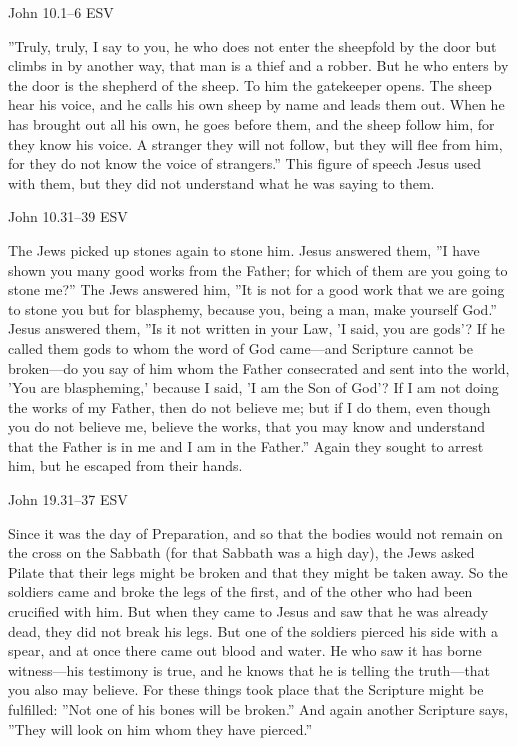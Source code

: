 \documentclass[
]{article}
\newcommand{\RL}[1]{\beginR #1\endR}
\begin{document}
John 10.1--6 ESV

\RL{''}Truly, truly, I say to you, he who does not enter the sheepfold
by the door but climbs in by another way, that man is a thief and a
robber. But he who enters by the door is the shepherd of the sheep. To
him the gatekeeper opens. The sheep hear his voice, and he calls his own
sheep by name and leads them out. When he has brought out all his own,
he goes before them, and the sheep follow him, for they know his voice.
A stranger they will not follow, but they will flee from him, for they
do not know the voice of strangers.'' This figure of speech Jesus used
with them, but they did not understand what he was saying to them.

John 10.31--39 ESV

The Jews picked up stones again to stone him. Jesus answered them,
\RL{''}I have shown you many good works from the Father; for which of
them are you going to stone me?'' The Jews answered him, \RL{''}It is
not for a good work that we are going to stone you but for blasphemy,
because you, being a man, make yourself God.'' Jesus answered them,
\RL{''}Is it not written in your Law, \RL{'}I said, you are gods\RL{'}?
If he called them gods to whom the word of God came---and Scripture
cannot be broken---do you say of him whom the Father consecrated and
sent into the world, \RL{'}You are blaspheming,\RL{'} because I said,
\RL{'}I am the Son of God\RL{'}? If I am not doing the works of my
Father, then do not believe me; but if I do them, even though you do not
believe me, believe the works, that you may know and understand that the
Father is in me and I am in the Father.'' Again they sought to arrest
him, but he escaped from their hands.

John 19.31--37 ESV

Since it was the day of Preparation, and so that the bodies would not
remain on the cross on the Sabbath (for that Sabbath was a high day),
the Jews asked Pilate that their legs might be broken and that they
might be taken away. So the soldiers came and broke the legs of the
first, and of the other who had been crucified with him. But when they
came to Jesus and saw that he was already dead, they did not break his
legs. But one of the soldiers pierced his side with a spear, and at once
there came out blood and water. He who saw it has borne witness---his
testimony is true, and he knows that he is telling the truth---that you
also may believe. For these things took place that the Scripture might
be fulfilled: \RL{''}Not one of his bones will be broken.'' And again
another Scripture says, \RL{''}They will look on him whom they have
pierced.''
\end{document}
